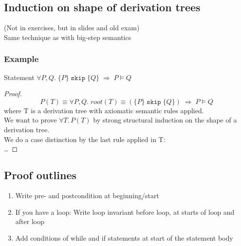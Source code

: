 \documentclass[11.5pt]{article}
\def\skipt{\texttt{skip}}
\begin{document}
\subsection{Induction on shape of derivation trees}
(Not in exercises, but in slides and old exam) \\
Same technique as with big-step semantics
\subsubsection{Example}
Statement $\forall P, Q. \; \{P\} \; \skipt \; \{Q\} \; \Rightarrow \; P \vDash Q$
\begin{proof}
    $$P(T)\equiv \forall P, Q. \; root(T)\equiv(\{P\} \; \skipt \; \{Q\}) \; \Rightarrow \; P \vDash Q$$
    where T is a derivation tree with axiomatic semantic rules applied. \\
    We want to prove $\forall T. \, P(T)$ by strong structural induction on the shape of a derivation tree. \\
    We do a case distinction by the last rule applied in T: \\
    \dots 
\end{proof}



\subsection{Proof outlines}
\begin{enumerate}
    \item Write pre- and postcondition at beginning/start
    \item If you have a loop: Write loop invariant before loop, at starts of loop and after loop
    \item Add conditions of while and if statements at start of the statement body
\end{enumerate}
\end{document}
